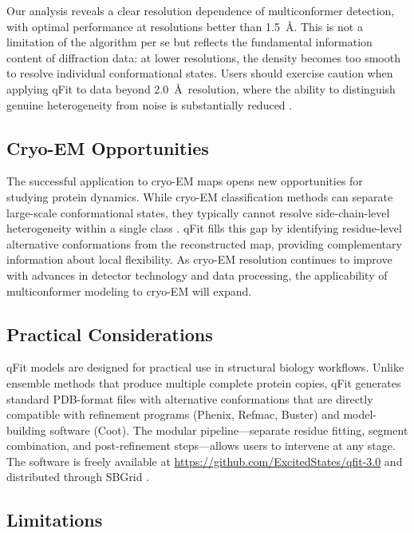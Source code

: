 \documentclass[12pt]{article}
\begin{document}
Our analysis reveals a clear resolution dependence of multiconformer detection, with optimal performance at resolutions better than 1.5~\AA. This is not a limitation of the algorithm per se but reflects the fundamental information content of diffraction data: at lower resolutions, the density becomes too smooth to resolve individual conformational states. Users should exercise caution when applying qFit to data beyond 2.0~\AA~resolution, where the ability to distinguish genuine heterogeneity from noise is substantially reduced \citep{lang2014automated}.

\subsection{Cryo-EM Opportunities}

The successful application to cryo-EM maps opens new opportunities for studying protein dynamics. While cryo-EM classification methods can separate large-scale conformational states, they typically cannot resolve side-chain-level heterogeneity within a single class \citep{nakane2018characterisation, zhong2021cryodrgn}. qFit fills this gap by identifying residue-level alternative conformations from the reconstructed map, providing complementary information about local flexibility. As cryo-EM resolution continues to improve with advances in detector technology and data processing, the applicability of multiconformer modeling to cryo-EM will expand.

\subsection{Practical Considerations}

qFit models are designed for practical use in structural biology workflows. Unlike ensemble methods that produce multiple complete protein copies, qFit generates standard PDB-format files with alternative conformations that are directly compatible with refinement programs (Phenix, Refmac, Buster) and model-building software (Coot). The modular pipeline---separate residue fitting, segment combination, and post-refinement steps---allows users to intervene at any stage. The software is freely available at \url{https://github.com/ExcitedStates/qfit-3.0} and distributed through SBGrid \citep{morin2013sbgrid}.

\subsection{Limitations}
\end{document}
